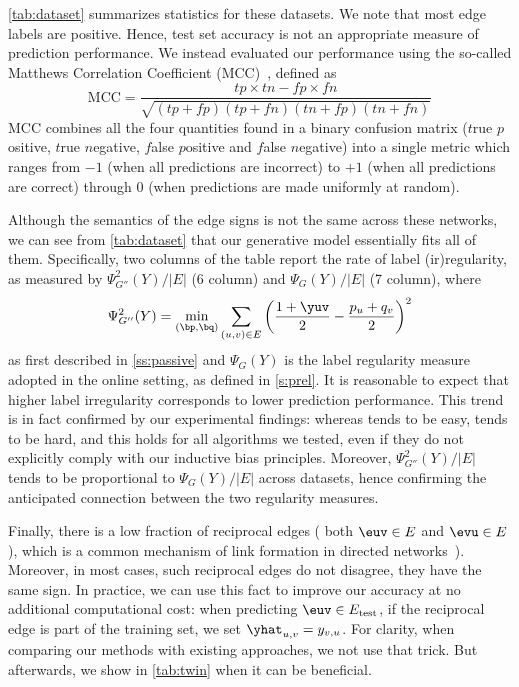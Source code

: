 \autoref{tab:dataset} summarizes statistics for these datasets. We note that most edge labels are
positive. Hence, test set accuracy is not an appropriate measure of prediction performance. We
instead evaluated our performance using the so-called Matthews Correlation Coefficient
(MCC)~\autocite{MCC00}, defined as
\begin{equation}
  \label{eq:troll_mcc}
	\mathrm{MCC} = \frac{tp\times tn-fp\times fn}%
        {\sqrt{ (tp + fp) ( tp + fn ) ( tn + fp ) ( tn + fn ) } }%
\end{equation}
MCC combines all the four quantities found in a binary confusion matrix ($t$rue $p$ositive, $t$rue
$n$egative, $f$alse $p$ositive and $f$alse $n$egative) into a single metric which ranges from $-1$
(when all predictions are incorrect) to $+1$ (when all predictions are correct) through $0$ (when
predictions are made uniformly at random).

Although the semantics of the edge signs is not the same across these networks, we can see from
\autoref{tab:dataset} that our generative model essentially fits all of them. Specifically,
two columns of the table report the rate of label (ir)regularity, as measured by
$\Psi^2_{G''}(Y)/|E|$ (6\thup{} column) and $\Psi_{G}(Y)/|E|$ (7\thup{} column), where 
\[
  \Psi^2_{G''}(Y) = \min_{(\bp,\bq)} \sum_{(u,v) \in E}
  \left(\frac{1+\yuv}{2} - \frac{p_u+q_v}{2} \right)^2
\]
as first described in \autoref{ss:passive}
and $\Psi_{G}(Y)$ is the
label regularity measure adopted in the online setting, as defined in \autoref{s:prel}. It is
reasonable to expect that higher label irregularity corresponds to lower prediction performance.
This trend is in fact confirmed by our experimental findings: whereas \epi{} tends to be easy,
\aut{} tends to be hard, and this holds for all algorithms we tested, even if they do not explicitly
comply with our inductive bias principles. Moreover, $\Psi^2_{G''}(Y)/|E|$ tends to be proportional
to $\Psi_{G}(Y)/|E|$ across datasets, hence confirming the anticipated connection between the two
regularity measures.

Finally, there is a low fraction of reciprocal edges (\ie{} both $\euv \in E$ and $\evu
\in E$), which is a common mechanism of link formation in directed
networks~\autocites{DirectedReciprocity04}{Reciprocity13}). Moreover, in most cases, such reciprocal edges do not disagree,
\ie{} they have the same sign. In practice, we can use this fact to improve our accuracy at no
additional computational cost: when predicting $\euv \in E_{\mathrm{test}}$, if the reciprocal edge
\evu{} is part of the training set, we set $\yhat_{u,v} = y_{v,u}$. For clarity, when comparing
our methods with existing approaches, we not use that trick. But afterwards, we show in
\autoref{tab:twin} when it can be beneficial.

